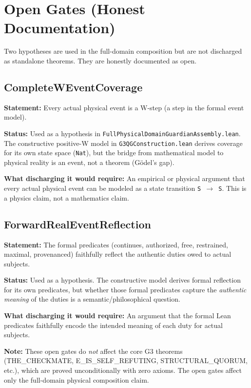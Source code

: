 \documentclass[11pt,a4paper]{article}
\newcommand{\lean}[1]{\texttt{#1}}
\begin{document}
\section{Open Gates (Honest Documentation)}

Two hypotheses are used in the full-domain composition but are not discharged as standalone theorems. They are honestly documented as open.

\subsection{CompleteWEventCoverage}

\textbf{Statement:} Every actual physical event is a W-step (a step in the formal event model).

\textbf{Status:} Used as a hypothesis in \lean{FullPhysicalDomainGuardianAssembly.lean}. The constructive positive-W model in \lean{G3QGConstruction.lean} derives coverage for its own state space (\lean{Nat}), but the bridge from mathematical model to physical reality is an event, not a theorem (G\"odel's gap).

\textbf{What discharging it would require:} An empirical or physical argument that every actual physical event can be modeled as a state transition \lean{S $\to$ S}. This is a physics claim, not a mathematics claim.

\subsection{ForwardRealEventReflection}

\textbf{Statement:} The formal predicates (continues, authorized, free, restrained, maximal, provenanced) faithfully reflect the authentic duties owed to actual subjects.

\textbf{Status:} Used as a hypothesis. The constructive model derives formal reflection for its own predicates, but whether those formal predicates capture the \emph{authentic meaning} of the duties is a semantic/philosophical question.

\textbf{What discharging it would require:} An argument that the formal Lean predicates faithfully encode the intended meaning of each duty for actual subjects.

\medskip
\noindent\textbf{Note:} These open gates do \emph{not} affect the core G3 theorems (THE\_CHECKMATE, E\_IS\_SELF\_REFUTING, STRUCTURAL\_QUORUM, etc.), which are proved unconditionally with zero axioms. The open gates affect only the full-domain physical composition claim.
\end{document}
